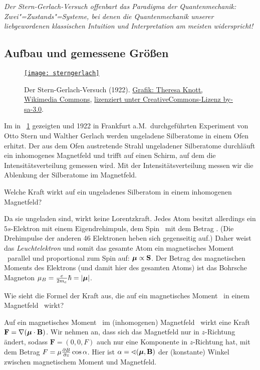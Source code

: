 \emph{Der Stern-Gerlach-Versuch offenbart das Paradigma der Quantenmechanik: Zwei"=Zustands"=Systeme, bei denen die Quantenmechanik unserer liebgewordenen klassischen Intuition und Interpretation am meisten widerspricht!}

\subsection{Aufbau und gemessene Gr\"o\ss{}en}
\begin{figure}
\href{http://commons.wikimedia.org/wiki/File:Stern-Gerlach_Experiment_de.png?uselang=de}{\texttt{[image: sterngerlach]}}
\caption{\label{fig:SG}Der Stern-Gerlach-Versuch (1922). \href{http://commons.wikimedia.org/wiki/File:Stern-Gerlach_Experiment_de.png?uselang=de}{Grafik: Theresa Knott, Wikimedia Commons}, \href{http://creativecommons.org/licenses/by-sa/3.0/deed.de}{lizenziert unter CreativeCommons-Lizenz by-sa-3.0}.}
\end{figure}

Im in \figurename~\ref{fig:SG} gezeigten und 1922 in Frankfurt a.M.\ durchgef\"uhrten Experiment von Otto Stern und Walther Gerlach werden ungeladene Silberatome in einem Ofen erhitzt. Der aus dem Ofen austretende Strahl ungeladener Silberatome durchl\"auft ein inhomogenes Magnetfeld und trifft auf einen Schirm, auf dem die Intensit\"atsverteilung gemessen wird. Mit der Intensit\"atsverteilung messen wir die Ablenkung der Silberatome im Magnetfeld.

\begin{frage}
 Welche Kraft wirkt auf ein ungeladenes Silberatom in einem inhomogenen Magnetfeld?
\end{frage}
\begin{antw}
Da sie ungeladen sind, wirkt keine Lorentzkraft. Jedes Atom besitzt allerdings ein $5s$-Elektron mit einem Eigendrehimpuls, dem Spin \spin\ mit dem Betrag \hbarh. (Die Drehimpulse der anderen 46 Elektronen heben sich gegenseitig auf.) Daher weist das \emph{Leuchtelektron} und somit das gesamte Atom ein magnetisches Moment \magnmom\ parallel und proportional zum Spin auf: $\boldsymbol{\mu} \propto \mathbf{S}$. Der Betrag des magnetischen Moments des Elektrons (und damit hier des gesamten Atoms) ist das Bohrsche Magneton $\mu_B = \frac{e}{2m_e}\hbar = |\boldsymbol{\mu}|$.
\end{antw}

\begin{frage}
 Wie sieht die Formel der Kraft aus, die auf ein magnetisches Moment \magnmom\ in einem Magnetfeld \magnf\ wirkt?
\end{frage}
\begin{antw}
 Auf ein magnetisches Moment \magnmom\  im (inhomogenen) Magnetfeld \magnf\ wirkt eine Kraft $\mathbf{F} = \nabla (\boldsymbol{\mu} \cdot \mathbf{B})$. Wir nehmen an, dass sich das Magnetfeld nur in $z$-Richtung \"andert, sodass $\mathbf{F} = (0,0,F)$ auch nur eine Komponente in $z$-Richtung hat, mit dem Betrag $F= \mu \frac{\partial B}{\partial z} \cos \alpha$. Hier ist $\alpha = \sphericalangle(\boldsymbol{\mu}, \mathbf{B})$ der (konstante) Winkel zwischen magnetischem Moment und Magnetfeld.
\end{antw}

